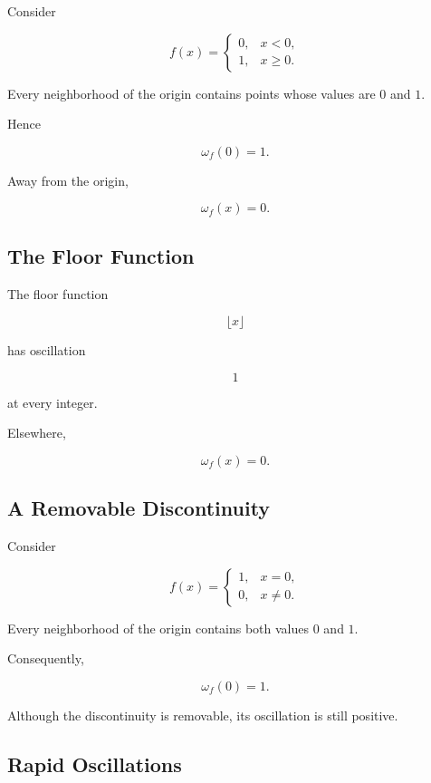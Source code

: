 \documentclass{essay}
\begin{document}
Consider

\[
  f(x)=
  \begin{cases}
    0,&x<0,\\
    1,&x\ge0.
  \end{cases}
\]

Every neighborhood of the origin contains points whose values are \(0\) and \(1\).

Hence

\[ \omega_{f}(0)=1. \]

Away from the origin,

\[ \omega_{f}(x)=0. \]


\subsection{The Floor Function}

The floor function

\[ \lfloor x\rfloor \]

has oscillation

\[ 1 \]

at every integer.

Elsewhere,

\[ \omega_{f}(x)=0. \]


\subsection{A Removable Discontinuity}

Consider

\[
  f(x)=
  \begin{cases}
    1,&x=0,\\
    0,&x\neq0.
  \end{cases}
\]

Every neighborhood of the origin contains both values \(0\) and \(1\).

Consequently,

\[ \omega_{f}(0)=1. \]

Although the discontinuity is removable, its oscillation is still positive.


\subsection{Rapid Oscillations}
\end{document}
